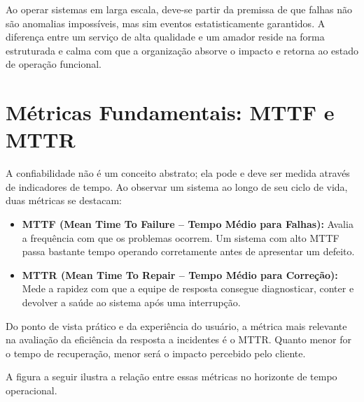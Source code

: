 \documentclass[12pt,a4paper]{report}
\begin{document}
Ao operar sistemas em larga escala, deve-se partir da premissa de que falhas não são anomalias impossíveis, mas sim eventos estatisticamente garantidos. A diferença entre um serviço de alta qualidade e um amador reside na forma estruturada e calma com que a organização absorve o impacto e retorna ao estado de operação funcional.

\section{Métricas Fundamentais: MTTF e MTTR}

A confiabilidade não é um conceito abstrato; ela pode e deve ser medida através de indicadores de tempo. Ao observar um sistema ao longo de seu ciclo de vida, duas métricas se destacam:
\begin{itemize}
    \item \textbf{MTTF (Mean Time To Failure -- Tempo Médio para Falhas):} Avalia a frequência com que os problemas ocorrem. Um sistema com alto MTTF passa bastante tempo operando corretamente antes de apresentar um defeito.
    \item \textbf{MTTR (Mean Time To Repair -- Tempo Médio para Correção):} Mede a rapidez com que a equipe de resposta consegue diagnosticar, conter e devolver a saúde ao sistema após uma interrupção.
\end{itemize}

Do ponto de vista prático e da experiência do usuário, a métrica mais relevante na avaliação da eficiência da resposta a incidentes é o MTTR. Quanto menor for o tempo de recuperação, menor será o impacto percebido pelo cliente. 

A figura a seguir ilustra a relação entre essas métricas no horizonte de tempo operacional.
\end{document}
